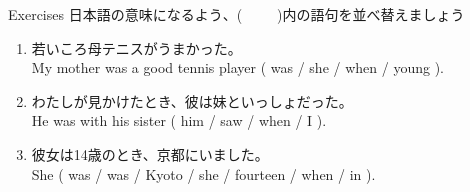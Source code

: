\documentclass[aspectratio=169,xcolor={dvipsnames,table}]{beamer}
\begin{document}
\begin{frame}[plain]{Exercises}
日本語の意味になるよう、(~~~~~)内の語句を並べ替えましょう

\begin{enumerate}
 \item 若いころ母テニスがうまかった。\\
       My mother was a good tennis player ( was / she / when / young ).\\
 \item わたしが見かけたとき、彼は妹といっしょだった。\\
       He was with his sister ( him / saw / when / I ). \\
 \item  彼女は14歳のとき、京都にいました。\\
	She ( was / was / Kyoto / she / fourteen / when / in ).\\
\end{enumerate}
\end{frame}
\end{document}
